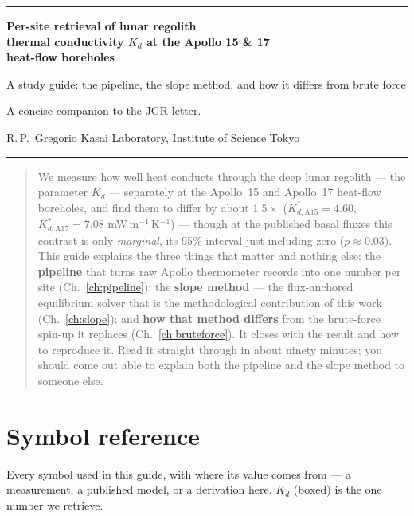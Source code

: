 \documentclass[11pt]{report}
\begin{document}
\thispagestyle{empty}
\begingroup\color{forest}\hrule height 2.5pt\endgroup
\vspace{8pt}
{\sffamily\bfseries\color{forest}\LARGE Per-site retrieval of lunar regolith\\[2pt]
thermal conductivity $K_d$ at the Apollo 15 \& 17\\[2pt]
heat-flow boreholes\par}
\vspace{6pt}
{\sffamily\Large\color{char} A study guide: the pipeline, the slope method, and how it differs from brute force\par}
\vspace{6pt}
{\color{dim}\large A concise companion to the JGR letter.\par}
\vspace{4pt}
{\color{char} R.\,P.\ Gregorio \quad\textbullet\quad Kasai Laboratory, Institute of Science Tokyo}
\vspace{6pt}
\begingroup\color{rulec}\hrule height 1pt\endgroup
\vspace{8pt}

\begin{abstract}
\noindent
We measure how well heat conducts through the deep lunar regolith --- the
parameter $K_d$ --- separately at the Apollo~15 and Apollo~17 heat-flow
boreholes, and find them to differ by about $1.5\times$
($K_{d,\mathrm{A15}}^{*}=4.60$, $K_{d,\mathrm{A17}}^{*}=7.08$
mW\,m$^{-1}$\,K$^{-1}$) --- though at the published basal fluxes this contrast is
only \emph{marginal}, its 95\% interval just including zero ($p\approx0.03$). This guide explains the three things that matter and
nothing else: the \textbf{pipeline} that turns raw Apollo thermometer records
into one number per site (Ch.~\ref{ch:pipeline}); the \textbf{slope method} ---
the flux-anchored equilibrium solver that is the methodological contribution of
this work (Ch.~\ref{ch:slope}); and \textbf{how that method differs} from the
brute-force spin-up it replaces (Ch.~\ref{ch:bruteforce}). It closes with the
result and how to reproduce it. Read it straight through in about ninety
minutes; you should come out able to explain both the pipeline and the slope
method to someone else.
\end{abstract}

\vspace{4pt}
\tableofcontents
\clearpage

\chapter*{Symbol reference}
\noindent Every symbol used in this guide, with where its value comes from ---
a measurement, a published model, or a derivation here. $K_d$ (boxed) is the one
number we retrieve.
\end{document}
